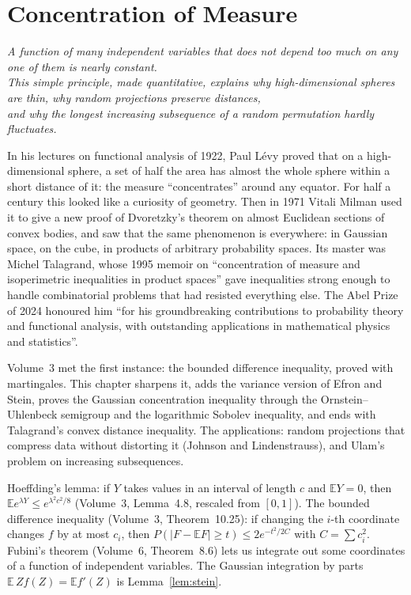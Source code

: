 \chapter{Concentration of Measure}
\begin{center}\itshape
A function of many independent variables that does not depend too much on any one of them is nearly constant.\\
This simple principle, made quantitative, explains why high-dimensional spheres are thin, why random projections preserve distances,\\
and why the longest increasing subsequence of a random permutation hardly fluctuates.
\end{center}

In his lectures on functional analysis of 1922, Paul L\'evy proved that on a high-dimensional sphere, a set of half the area has almost the whole sphere within a short distance of it: the
measure ``concentrates'' around any equator. For half a century this looked like a curiosity of geometry. Then in 1971 Vitali Milman used it to give a new
proof of Dvoretzky's theorem on almost Euclidean sections of convex bodies, and saw that the same phenomenon is everywhere: in Gaussian space, on the cube,
in products of arbitrary probability spaces. Its master was Michel Talagrand, whose 1995 memoir on ``concentration of measure and isoperimetric inequalities
in product spaces'' gave inequalities strong enough to handle combinatorial problems that had resisted everything else. The Abel Prize of 2024 honoured him
``for his groundbreaking contributions to probability theory and functional analysis, with outstanding applications in mathematical physics and statistics''.

Volume~3 met the first instance: the bounded difference inequality, proved with martingales. This chapter sharpens it, adds the variance version of
Efron and Stein, proves the Gaussian concentration inequality through the Ornstein--Uhlenbeck semigroup and the logarithmic Sobolev inequality, and ends with
Talagrand's convex distance inequality. The applications: random projections that compress data without distorting it (Johnson and Lindenstrauss), and Ulam's
problem on increasing subsequences.

\begin{reminder}
Hoeffding's lemma: if $Y$ takes values in an interval of length $c$ and $\mathbb EY=0$, then $\mathbb Ee^{\lambda Y}\le e^{\lambda^2c^2/8}$ (Volume~3, Lemma~4.8, rescaled from $[0,1]$).
The bounded difference inequality (Volume~3, Theorem~10.25): if changing the $i$-th coordinate changes $f$ by at most $c_i$, then
$P(|F-\mathbb EF|\ge t)\le2e^{-t^2/2C}$ with $C=\sum c_i^2$. Fubini's theorem (Volume~6, Theorem~8.6) lets us integrate out some coordinates of a function of independent
variables. The Gaussian integration by parts $\mathbb E\,Zf(Z)=\mathbb Ef'(Z)$ is Lemma~\ref{lem:stein}.
\end{reminder}

